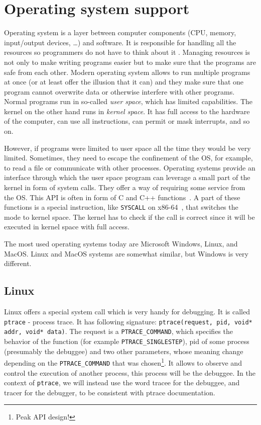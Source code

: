 \section{Operating system support}
Operating system is a layer between computer components (CPU, memory,
input/output devices, \dots) and software. It is responsible for handling all
the resources so programmers do not have to think about it \cite{modern-os,
os-concepts}. Managing resources is not only to make writing programs easier
but to make sure that the programs are safe from each other. Modern operating
system allows to run multiple programs at once (or at least offer the illusion
that it can) and they make sure that one program cannot overwrite data or
otherwise interfere with other programs. Normal programs run in so-called
\textit{user space}, which has limited capabilities. The kernel on the other
hand runs in \textit{kernel space}. It has full access to the hardware of the
computer, can use all instructions, can permit or mask interrupts, and so on.

However, if programs were limited to user space all the time they would be very
limited. Sometimes, they need to escape the confinement of the OS, for example,
to read a file or communicate with other processes. Operating systems provide
an interface through which the user space program can leverage a small part of
the kernel in form of system calls. They offer a way of requiring some service
from the OS. This API is often in form of C and C++
functions~\cite{os-concepts}. A part of these functions is a special
instruction, like \texttt{SYSCALL} on x86-64~\cite{intel-manual}, that switches
the mode to kernel space. The kernel has to check if the call is correct since
it will be executed in kernel space with full access.

The most used operating systems today are Microsoft Windows, Linux, and MacOS.
Linux and MacOS systems are somewhat similar, but Windows is very different.

\subsection{Linux}\label{section:linux-dbg}
Linux offers a special system call which is very handy for debugging. It is
called \texttt{ptrace} \cite{ptrace} - process trace. It has following
signature: \texttt{ptrace(request, pid, void* addr, void* data)}. The request
is a \texttt{PTRACE\_COMMAND}, which specifies the behavior of the function
(for example \texttt{PTRACE\_SINGLESTEP}), pid of some process (presumably the
debuggee) and two other parameters, whose meaning change depending on the
\texttt{PTRACE\_COMMAND} that was chosen\footnote{Peak API design!}. It allows
to observe and control the execution of another process, this process will be
the debuggee. In the context of \texttt{ptrace}, we will instead use the word
tracee for the debuggee, and tracer for the debugger, to be consistent with
ptrace documentation.

